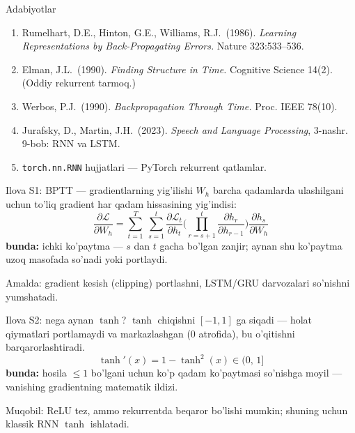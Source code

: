 \documentclass[aspectratio=169,11pt]{beamer}
\newcommand{\bunda}[1]{{\small\textbf{bunda:}\; #1}}
\begin{document}
\begin{frame}{Adabiyotlar}
  \begin{enumerate}\small\setlength\itemsep{5pt}
    \item Rumelhart, D.E., Hinton, G.E., Williams, R.J.\ (1986). \textit{Learning
          Representations by Back-Propagating Errors.} Nature 323:533--536.
    \item Elman, J.L.\ (1990). \textit{Finding Structure in Time.} Cognitive
          Science 14(2). (Oddiy rekurrent tarmoq.)
    \item Werbos, P.J.\ (1990). \textit{Backpropagation Through Time.} Proc. IEEE 78(10).
    \item Jurafsky, D., Martin, J.H.\ (2023). \textit{Speech and Language
          Processing}, 3-nashr. 9-bob: RNN va LSTM.
    \item \texttt{torch.nn.RNN} hujjatlari --- PyTorch rekurrent qatlamlar.
  \end{enumerate}
\end{frame}

\appendix

\begin{frame}{Ilova S1: BPTT --- gradientlarning yig'ilishi}
  \small
  $W_h$ barcha qadamlarda ulashilgani uchun to'liq gradient har qadam hissasining
  yig'indisi:
  $$ \frac{\partial \mathcal{L}}{\partial W_h}
     = \sum_{t=1}^{T}\ \sum_{s=1}^{t}
       \frac{\partial \mathcal{L}_t}{\partial h_t}
       \Big(\prod_{r=s+1}^{t}\frac{\partial h_r}{\partial h_{r-1}}\Big)
       \frac{\partial h_s}{\partial W_h} $$
  \bunda{ichki ko'paytma --- $s$ dan $t$ gacha bo'lgan zanjir; aynan shu ko'paytma
  uzoq masofada so'nadi yoki portlaydi.}
  \vspace{4pt}

  Amalda: gradient kesish (clipping) portlashni, LSTM/GRU darvozalari so'nishni
  yumshatadi.
\end{frame}

\begin{frame}{Ilova S2: nega aynan $\tanh$?}
  \small
  $\tanh$ chiqishni $[-1,1]$ ga siqadi --- holat qiymatlari portlamaydi va
  markazlashgan (0 atrofida), bu o'qitishni barqarorlashtiradi.
  $$ \tanh'(x) = 1 - \tanh^2(x) \in (0,\,1] $$
  \bunda{hosila $\leq 1$ bo'lgani uchun ko'p qadam ko'paytmasi so'nishga moyil ---
  vanishing gradientning matematik ildizi.}
  \vspace{4pt}

  Muqobil: ReLU tez, ammo rekurrentda beqaror bo'lishi mumkin; shuning uchun klassik
  RNN $\tanh$ ishlatadi.
\end{frame}
\end{document}

